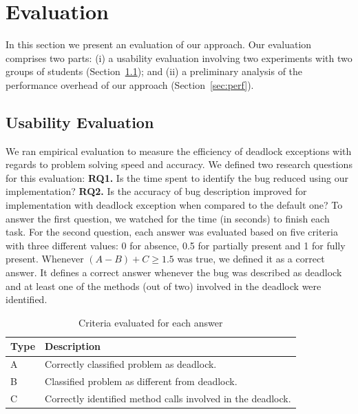 \section{Evaluation}

In this section we present an evaluation of our approach. Our evaluation comprises two parts: (i) a usability evaluation involving two experiments with two groups of students (Section~\ref{sec:usab}); and (ii) a preliminary analysis of the performance overhead of our approach (Section~\ref{sec:perf}).

\subsection{Usability Evaluation}\label{sec:usab}

We ran empirical evaluation to measure the efficiency of deadlock exceptions with regards to problem solving speed and accuracy. We defined two research questions for this evaluation: {\bf RQ1.} Is the time spent to identify the bug reduced using our implementation? {\bf RQ2.} Is the accuracy of bug description improved for implementation with deadlock exception when compared to the default one? To answer the first question, we watched for the time (in seconds) to finish each task. For the second question, each answer was evaluated based on five criteria with three different values: 0 for absence, 0.5 for partially present and 1 for fully present. Whenever $(A - B) + C \geq 1.5$ was true, we defined it as a correct answer. It defines a correct answer whenever the bug was described as deadlock and at least one of the methods (out of two) involved in the deadlock were identified.

\begin{table}
\begin{center}
\caption{Criteria evaluated for each answer}
\begin{tabular}{|l|l|}
\hline
Type & Description \\
\hline
A & Correctly classified problem as deadlock.\\
B & Classified problem as different from deadlock.\\
C & Correctly identified method calls involved in the deadlock.\\
\hline
\end{tabular}
\end{center}
\end{table}

